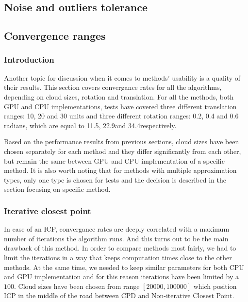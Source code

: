 \documentclass[titlepage]{article}
\begin{document}
\subsection{Noise and outliers tolerance}

\subsection{Convergence ranges}

\subsubsection{Introduction}
Another topic for discussion when it comes to methods' usability is a quality of their results. This section covers convergance rates for all the algorithms, depending on cloud sizes, rotation and translation. For all the methods, both GPU and CPU implementations, tests have covered three different translation ranges: 10, 20 and 30 units and three different rotation ranges: 0.2, 0.4 and 0.6 radians, which are equal to 11.5\degree, 22.9\degree and 34.4\degree respectively.

Based on the performance results from previous sections, cloud sizes have been chosen separately for each method and they differ significantly from each other, but remain the same between GPU and CPU implementation of a specific method. It is also worth noting that for methods with multiple approximation types, only one type is chosen for tests and the decision is described in the section focusing on specific method.

\subsubsection{Iterative closest point}
In case of an ICP, convergance rates are deeply correlated with a maximum number of iterations the algorithm runs. And this turns out to be the main drawback of this method. In order to compare methods most fairly, we had to limit the iterations in a way that keeps computation times close to the other methods. At the same time, we needed to keep similar parameters for both CPU and GPU implementation and for this reason iterations have been limited by a $100$. Cloud sizes have been chosen from range $[20000,100000]$ which position ICP in the middle of the road between CPD and Non-iterative Closest Point.
\end{document}
